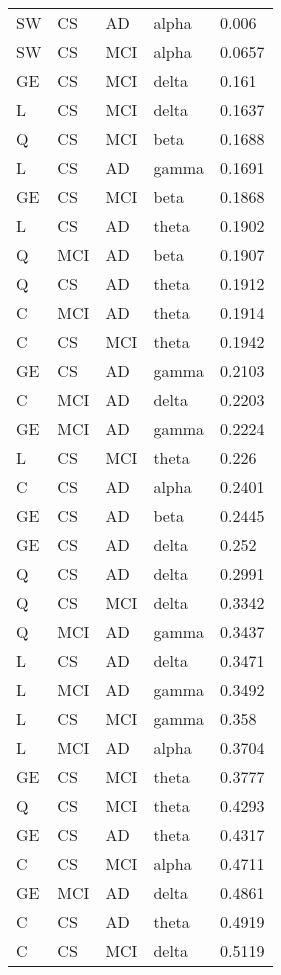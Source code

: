 \begin{center}
\begin{longtable}{|l|l|l|l|l|}
				\hline \hline
				\endlastfoot
					SW & CS  & AD  & alpha & 0.006  \\
					SW & CS  & MCI & alpha & 0.0657 \\
					GE & CS  & MCI & delta & 0.161  \\
					L  & CS  & MCI & delta & 0.1637 \\
					Q  & CS  & MCI & beta  & 0.1688 \\
					L  & CS  & AD  & gamma & 0.1691 \\
					GE & CS  & MCI & beta  & 0.1868 \\
					L  & CS  & AD  & theta & 0.1902 \\
					Q  & MCI & AD  & beta  & 0.1907 \\
					Q  & CS  & AD  & theta & 0.1912 \\
					C  & MCI & AD  & theta & 0.1914 \\
					C  & CS  & MCI & theta & 0.1942 \\
					GE & CS  & AD  & gamma & 0.2103 \\
					C  & MCI & AD  & delta & 0.2203 \\
					GE & MCI & AD  & gamma & 0.2224 \\
					L  & CS  & MCI & theta & 0.226  \\
					C  & CS  & AD  & alpha & 0.2401 \\
					GE & CS  & AD  & beta  & 0.2445 \\
					GE & CS  & AD  & delta & 0.252  \\
					Q  & CS  & AD  & delta & 0.2991 \\
					Q  & CS  & MCI & delta & 0.3342 \\
					Q  & MCI & AD  & gamma & 0.3437 \\
					L  & CS  & AD  & delta & 0.3471 \\
					L  & MCI & AD  & gamma & 0.3492 \\
					L  & CS  & MCI & gamma & 0.358  \\
					L  & MCI & AD  & alpha & 0.3704 \\
					GE & CS  & MCI & theta & 0.3777 \\
					Q  & CS  & MCI & theta & 0.4293 \\
					GE & CS  & AD  & theta & 0.4317 \\
					C  & CS  & MCI & alpha & 0.4711 \\
					GE & MCI & AD  & delta & 0.4861 \\
					C  & CS  & AD  & theta & 0.4919 \\
					C  & CS  & MCI & delta & 0.5119 \\

\end{longtable}
\end{center}
